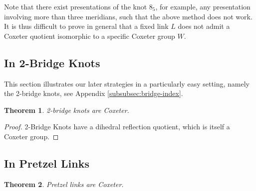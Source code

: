 \documentclass[a4paper]{article}
\newtheorem{theorem}{Theorem}[section]
\theoremstyle{definition}
\begin{document}
Note that there exist presentations of the knot $8_5$, for example, any presentation involving more than three meridians, such that the above method does not work. It is thus difficult to prove in general that a fixed link $L$ does not admit a Coxeter quotient isomorphic to a specific Coxeter group $W$.

\subsection{In 2-Bridge Knots}
This section illustrates our later strategies in a particularly easy setting, namely the 2-bridge knots, see Appendix \ref{subsubsec:bridge-index}.
\begin{theorem}
2-bridge knots are Coxeter.
\end{theorem}

\begin{proof}
2-Bridge Knots have a dihedral reflection quotient, which is itself a Coxeter group.
\end{proof}


\subsection{In Pretzel Links}
\begin{theorem}\label{thm:pretzel-links-are-coxeter}
Pretzel links are Coxeter. 
\end{theorem}
\end{document}
